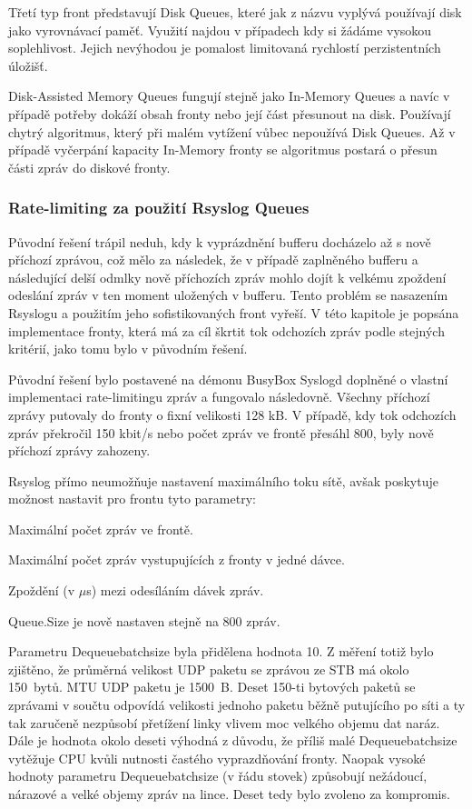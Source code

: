 \documentclass[thesis=B,czech]{FITthesis}[2012/06/26]
\begin{document}
Třetí typ front představují Disk Queues, které jak z názvu vyplývá používají disk jako vyrovnávací paměť. Využití najdou v případech kdy si žádáme vysokou soplehlivost. Jejich nevýhodou je pomalost limitovaná rychlostí perzistentních úložišť.

Disk-Assisted Memory Queues fungují stejně jako In-Memory Queues a navíc v případě potřeby dokáží obsah fronty nebo její část přesunout na disk. Používají chytrý algoritmus, který při malém vytížení vůbec nepoužívá Disk Queues. Až v případě vyčerpání kapacity In-Memory fronty se algoritmus postará o přesun části zpráv do diskové fronty.

\subsubsection*{Rate-limiting za použití Rsyslog Queues}
Původní řešení trápil neduh, kdy k vyprázdnění bufferu docházelo až s nově příchozí zprávou, což mělo za následek, že v případě zaplněného bufferu a následující delší odmlky nově příchozích zpráv mohlo dojít k velkému zpoždení odeslání zpráv v ten moment uložených v bufferu. Tento problém se nasazením Rsyslogu a použitím jeho sofistikovaných front vyřeší.
V této kapitole je popsána implementace fronty, která má za cíl škrtit tok odchozích zpráv podle stejných kritérií, jako tomu bylo v původním řešení.

Původní řešení bylo postavené na démonu BusyBox Syslogd doplněné o vlastní implementaci rate-limitingu zpráv a fungovalo následovně. Všechny příchozí zprávy putovaly do fronty o fixní velikosti 128 kB. V případě, kdy tok odchozích zpráv překročil 150 kbit/s nebo počet zpráv ve frontě přesáhl 800, byly nově příchozí zprávy zahozeny.

Rsyslog přímo neumožňuje nastavení maximálního toku sítě, avšak poskytuje možnost nastavit pro frontu tyto parametry:
\begin{description}
  \setlength\itemsep{-1ex}
  \item [Queue.Size:] Maximální počet zpráv ve frontě.
  \item [Queue.Dequeuebatchsize:] Maximální počet zpráv vystupujících z fronty v jedné dávce.
  \item [Queue.Dequeueslowdown:] Zpoždění (v $\mu$s) mezi odesíláním dávek zpráv.
\end{description}

Queue.Size je nově nastaven stejně na 800 zpráv.

Parametru Dequeuebatchsize byla přidělena hodnota 10. Z měření totiž bylo zjištěno, že průměrná velikost UDP paketu se zprávou ze STB má okolo 150~bytů. MTU UDP paketu je 1500~B. Deset 150-ti bytových paketů se zprávami v součtu odpovídá velikosti jednoho paketu běžně putujícího po síti a ty tak zaručeně nezpůsobí přetížení linky vlivem moc velkého objemu dat naráz.
Dále je hodnota okolo deseti výhodná z důvodu, že příliš malé Dequeuebatchsize vytěžuje CPU kvůli nutnosti častého vyprazdňování fronty. Naopak vysoké hodnoty parametru Dequeuebatchsize (v řádu stovek) způsobují nežádoucí, nárazové a velké objemy zpráv na lince. Deset tedy bylo zvoleno za kompromis.
  
\end{document}

